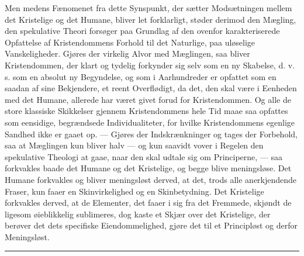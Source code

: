 \documentclass[12pt,a4paper,openany]{book}
\begin{document}
Men medens Fænomenet fra dette Synspunkt, der
sætter Modsætningen mellem det Kristelige og det Humane,
bliver let forklarligt, støder derimod den Mægling, den
spekulative Theori forsøger paa Grundlag af den ovenfor
karakteriserede Opfattelse af Kristendommens Forhold til det
Naturlige, paa uløselige Vanskeligheder. Gjøres der virkelig
Alvor med Mæglingen, saa bliver Kristendommen, der
klart og tydelig forkynder sig selv som en ny Skabelse, d.
v. s. som en absolut ny Begyndelse, og som i Aarhundreder
er opfattet som en saadan af sine Bekjendere, et reent Overflødigt,
da det, den skal være i Eenheden med det Humane,
allerede har været givet forud for Kristendommen. Og alle
de store klassiske Skikkelser gjennem Kristendommens hele
Tid maae saa opfattes som eensidige, begrændsede Individualiteter,
for hvilke Kristendommens egenlige Sandhed ikke er
gaaet op. --- Gjøres der Indskrænkninger og tages der Forbehold,
saa at Mæglingen kun bliver halv --- og kun saavidt
vover i Regelen den spekulative Theologi at gaae, naar
den skal udtale sig om Principerne, --- saa forkvakles baade
det Humane og det Kristelige, og begge blive meningsløse.
Det Humane forkvakles og bliver meningsløst derved, at
det, trods alle anerkjendende Fraser, kun faaer en Skinvirkelighed
og en Skinbetydning. Det Kristelige forkvakles
derved, at de Elementer, det faaer i sig fra det Fremmede,
skjøndt de ligesom øieblikkelig sublimeres, dog kaste et Skjær
over det Kristelige, der berøver det dets specifiske Eiendommelighed,
gjøre det til et Principløst og derfor Meningsløst.

\begin{center}\rule{1.8cm}{0.4pt}\end{center}
\end{document}
